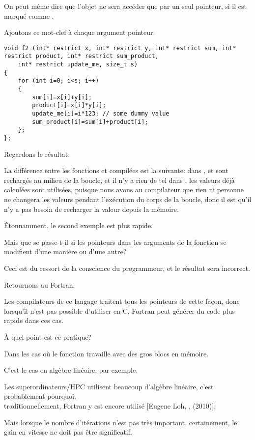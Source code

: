 On peut même dire que l'objet ne sera accéder que par un seul pointeur, si il est
marqué comme .

Ajoutons ce mot-clef à chaque argument pointeur:

\begin{lstlisting}[style=customc]
void f2 (int* restrict x, int* restrict y, int* restrict sum, int* restrict product, int* restrict sum_product, 
	int* restrict update_me, size_t s)
{
	for (int i=0; i<s; i++)
	{
		sum[i]=x[i]+y[i];
		product[i]=x[i]*y[i];
		update_me[i]=i*123; // some dummy value
		sum_product[i]=sum[i]+product[i];	
	};
};
\end{lstlisting}

Regardons le résultat:





La différence entre les fonctions  et  compilées est la suivante:
dans ,  et 
sont rechargés au milieu de la boucle, et il n'y a rien de tel dans , les
valeurs déjà calculées sont utilisées, puisque nous avons  au compilateur
que rien ni personne ne changera les valeurs pendant l'exécution du corps de la boucle,
donc il est  qu'il n'y a pas besoin de recharger la valeur depuis la mémoire.

Étonnamment, le second exemple est plus rapide.

Mais que se passe-t-il si les pointeurs dans les arguments de la fonction se
modifient d'une manière ou d'une autre?

Ceci est du ressort de la conscience du programmeur, et le résultat sera incorrect.

Retournons au Fortran.

Les compilateurs de ce langage traitent tous les pointeurs de cette façon, donc lorsqu'il
n'est pas possible d'utiliser  en C, Fortran peut générer du code plus
rapide dans ces cas.

À quel point est-ce pratique?

Dans les cas où le fonction travaille avec des gros blocs en mémoire.

C'est le cas en algèbre linéaire, par exemple.

Les superordinateurs/\ac{HPC} utilisent beaucoup d'algèbre linéaire, c'est probablement
pourquoi,\\
traditionnellement, Fortran y est encore utilisé [Eugene Loh, , (2010)].

Mais lorsque le nombre d'itérations n'est pas très important, certainement, le gain
en vitesse ne doit pas être significatif.
